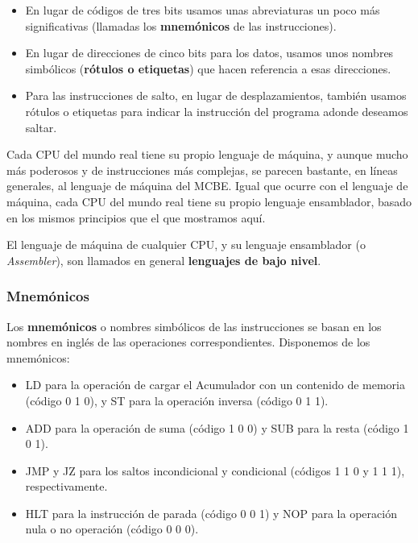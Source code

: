 \documentclass[spanish,A4,]{article}
\begin{document}
\begin{itemize}
\itemsep1pt\parskip0pt
\item
  En lugar de códigos de tres bits usamos unas abreviaturas un poco más
  significativas (llamadas los \textbf{mnemónicos} de las
  instrucciones).
\item
  En lugar de direcciones de cinco bits para los datos, usamos unos
  nombres simbólicos (\textbf{rótulos o etiquetas}) que hacen referencia
  a esas direcciones.
\item
  Para las instrucciones de salto, en lugar de desplazamientos, también
  usamos rótulos o etiquetas para indicar la instrucción del programa
  adonde deseamos saltar.
\end{itemize}

Cada CPU del mundo real tiene su propio lenguaje de máquina, y aunque
mucho más poderosos y de instrucciones más complejas, se parecen
bastante, en líneas generales, al lenguaje de máquina del MCBE. Igual
que ocurre con el lenguaje de máquina, cada CPU del mundo real tiene su
propio lenguaje ensamblador, basado en los mismos principios que el que
mostramos aquí.

El lenguaje de máquina de cualquier CPU, y su lenguaje ensamblador (o
\emph{Assembler}), son llamados en general \textbf{lenguajes de bajo
nivel}.

\subsubsection{Mnemónicos}\label{mnemuxf3nicos}

Los \textbf{mnemónicos} o nombres simbólicos de las instrucciones se
basan en los nombres en inglés de las operaciones correspondientes.
Disponemos de los mnemónicos:

\begin{itemize}
\itemsep1pt\parskip0pt
\item
  LD para la operación de cargar el Acumulador con un contenido de
  memoria (código 0 1 0), y ST para la operación inversa (código 0 1 1).
\item
  ADD para la operación de suma (código 1 0 0) y SUB para la resta (código
  1 0 1).
\item
  JMP y JZ para los saltos incondicional y condicional (códigos 1 1 0 y
  1 1 1), respectivamente.
\item
  HLT para la instrucción de parada (código 0 0 1) y NOP para la operación
  nula o no operación (código 0 0 0).
\end{itemize}
\end{document}
